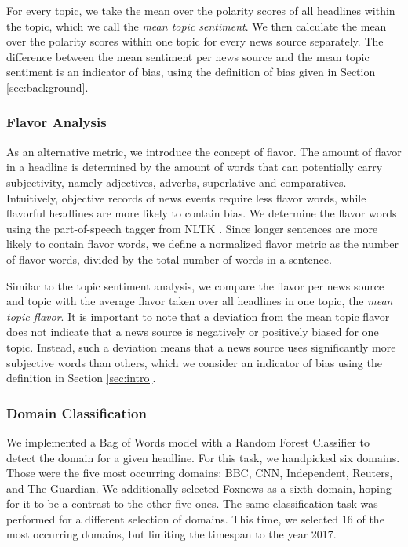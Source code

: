 \documentclass[final]{ieee}
\begin{document}
For every topic, we take the mean over the polarity scores of all headlines within the topic, which we call the \textit{mean topic sentiment}. We then calculate the mean over the polarity scores within one topic for every news source separately. The difference between the mean sentiment per news source and the mean topic sentiment is an indicator of bias, using the definition of bias given in Section \ref{sec:background}.

\subsubsection{Flavor Analysis}\label{sec:flavor}

As an alternative metric, we introduce the concept of flavor. The amount of flavor in a headline is determined by the amount of words that can potentially carry subjectivity, namely adjectives, adverbs, superlative and comparatives. Intuitively, objective records of news events require less flavor words, while flavorful headlines are more likely to contain bias. We determine the flavor words using the part-of-speech tagger from NLTK \cite{NLTK09}. Since longer sentences are more likely to contain flavor words, we define a normalized flavor metric as the number of flavor words, divided by the total number of words in a sentence.

Similar to the topic sentiment analysis, we compare the flavor per news source and topic with the average flavor taken over all headlines in one topic, the \textit{mean topic flavor}. It is important to note that a deviation from the mean topic flavor does not indicate that a news source is negatively or positively biased for one topic. Instead, such a deviation means that a news source uses significantly more subjective words than others, which we consider an indicator of bias using the definition in Section \ref{sec:intro}. 

\subsubsection{Domain Classification}\label{sec:domain classification}
We implemented a Bag of Words model with a Random Forest Classifier to detect the domain for a given headline. For this task, we handpicked six domains. Those were the five most occurring domains: BBC, CNN, Independent, Reuters, and The Guardian. We additionally selected Foxnews as a sixth domain, hoping for it to be a contrast to the other five ones. The same classification task was performed for a different selection of domains. This time, we selected 16 of the most occurring domains, but limiting the timespan to the year 2017.
\end{document}
